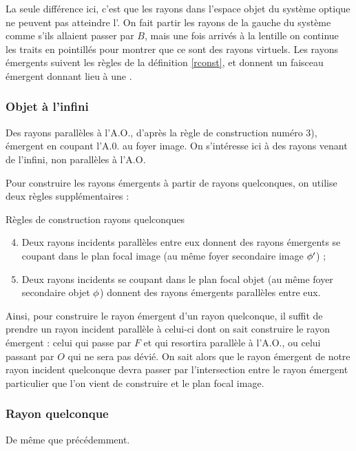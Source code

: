 \documentclass[10pt,a5paper,notitlepage]{book}
\begin{document}
La seule différence ici, c'est que les rayons dans l'espace objet du
système optique ne peuvent pas atteindre l'. On fait partir les rayons de
la gauche du système comme s'ils allaient passer par $B$, mais une fois arrivés
à la lentille on continue les traits en pointillés pour montrer que ce sont des
rayons virtuels. Les rayons émergents suivent les règles de la définition
\ref{rconst}, et donnent un faisceau émergent  donnant lieu à une
.

\subsubsection{Objet à l'infini}
Des rayons parallèles à l'A.O., d'après la règle de construction
numéro \textcolor{brandeisblue}{3)}, émergent en coupant l'A.0. au foyer image.
On s'intéresse ici à des rayons venant de l'infini, non parallèles à l'A.O.
\bigbreak

Pour construire les rayons émergents à partir de rayons quelconques, on utilise
deux règles supplémentaires :

\begin{defi}[label = rconstp]{Règles de construction rayons quelconques}
    \begin{enumerate}
        \setcounter{enumi}{3}
        \item Deux rayons incidents parallèles entre eux donnent des rayons
            émergents se coupant dans le plan focal image (au même foyer
            secondaire image $\phi'$) ;
        \item Deux rayons incidents se coupant dans le plan focal objet (au même
            foyer secondaire objet $\phi$) donnent des rayons émergents
            parallèles entre eux.
    \end{enumerate}
\end{defi}

Ainsi, pour construire le rayon émergent d'un rayon quelconque, il suffit de
prendre un rayon incident parallèle à celui-ci dont on sait construire le rayon
émergent : celui qui passe par $F$ et qui resortira parallèle à l'A.O., ou celui
passant par $O$ qui ne sera pas dévié. On sait alors que le rayon émergent de
notre rayon incident quelconque devra passer par l'intersection entre le rayon
émergent particulier que l'on vient de construire et le plan focal image.

\subsubsection{Rayon quelconque}
De même que précédemment.
\end{document}
